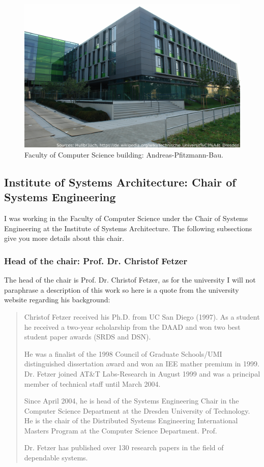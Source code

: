 \documentclass[a4paper,11pt]{report}
\begin{document}
\begin{figure}[ht]
\begin{center}
\includegraphics[width=1\linewidth]{images/informatik_bau.jpg}
\caption{Faculty of Computer Science building: Andreas-Pfitzmann-Bau.}
\label{informatik_bau}
\end{center}
\end{figure}

\subsection{Institute of Systems Architecture: Chair of Systems Engineering}

I was working in the Faculty of Computer Science under the Chair of Systems Engineering at the Institute of Systems Architecture. The following subsections give you more details about this chair.

\subsubsection{Head of the chair: Prof. Dr. Christof Fetzer}

The head of the chair is Prof. Dr. Christof Fetzer, as for the university I will not paraphrase a description of this work so here is a quote from the university website \cite{tud:chair:head} regarding his background:

\blockquote{Christof Fetzer received his Ph.D. from UC San Diego (1997). 
As a student he received a two-year scholarship from the DAAD and won two best student paper awards (SRDS and DSN). 

He was a finalist of the 1998 Council of Graduate Schools/UMI distinguished dissertation award and won an IEE mather premium in 1999. Dr. Fetzer joined AT\&T Labs-Research in August 1999 and was a principal member of technical staff until March 2004. 

Since April 2004, he is head of the Systems Engineering Chair in the Computer Science Department at the Dresden University of Technology. He is the chair of the Distributed Systems Engineering International Masters Program at the Computer Science Department. Prof. 

Dr. Fetzer has published over 130 research papers in the field of dependable systems.}
 
\end{document}
